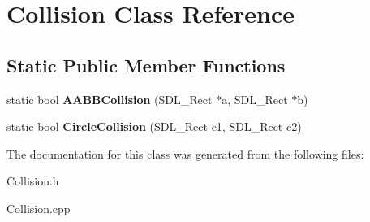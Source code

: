 \hypertarget{class_collision}{}\section{Collision Class Reference}
\label{class_collision}
\subsection*{Static Public Member Functions}
\begin{DoxyCompactItemize}
\item 
\hypertarget{class_collision_ab72868eae1e48ea5c355c109d8cfc912}{}static bool {\bfseries A\+A\+B\+B\+Collision} (S\+D\+L\+\_\+\+Rect $\ast$a, S\+D\+L\+\_\+\+Rect $\ast$b)\label{class_collision_ab72868eae1e48ea5c355c109d8cfc912}

\item 
\hypertarget{class_collision_ac8dc877b6d5d90acd93ff8ad4632fd20}{}static bool {\bfseries Circle\+Collision} (S\+D\+L\+\_\+\+Rect c1, S\+D\+L\+\_\+\+Rect c2)\label{class_collision_ac8dc877b6d5d90acd93ff8ad4632fd20}

\end{DoxyCompactItemize}


The documentation for this class was generated from the following files\+:\begin{DoxyCompactItemize}
\item 
Collision.\+h\item 
Collision.\+cpp\end{DoxyCompactItemize}
